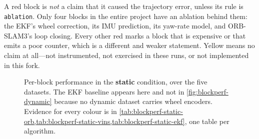\begin{queried}
A red block is \emph{not} a claim that it caused the trajectory error, unless its
rule is \texttt{ablation}. Only four blocks in the entire project have an
ablation behind them: the EKF's wheel correction, its IMU prediction, its
yaw-rate model, and ORB-SLAM3's loop closing. Every other red marks a block that
is expensive or that emits a poor counter, which is a different and weaker
statement. Yellow means no claim at all---not instrumented, not exercised in these
runs, or not implemented in this fork.
\end{queried}

\begin{figure}[p]
  \centering
  \caption{Per-block performance in the \textbf{static} condition, over the five
   datasets. The EKF baseline appears here and not in
  \cref{fig:blockperf-dynamic} because no dynamic dataset carries wheel encoders.
  Evidence for every colour is in \cref{tab:blockperf-static-orb,tab:blockperf-static-vins,tab:blockperf-static-ekf}, one table per algorithm.}
  \label{fig:blockperf-static}
\end{figure}
\clearpage

